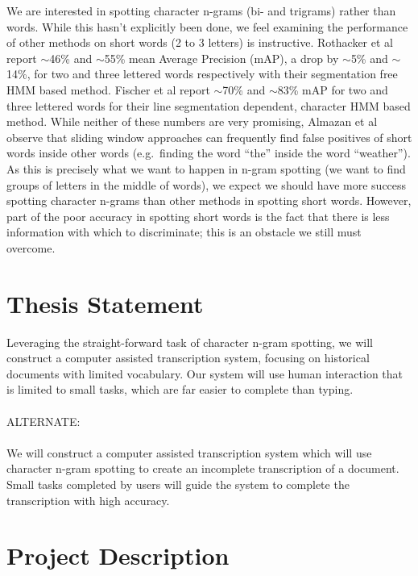 \documentclass[ms]{byuprop}
\begin{document}
We are interested in spotting character n-grams (bi- and trigrams) rather than words. While this hasn't explicitly been done, we feel examining the performance of other methods on short words (2 to 3 letters) is instructive. Rothacker et al\cite{Rothacker2013} report $\sim$46\% and $\sim$55\% mean Average Precision (mAP), a drop by $\sim$5\% and $\sim$14\%, for two and three lettered words respectively with their segmentation free HMM based method. Fischer et al\cite{Fischer2012} report $\sim$70\% and $\sim$83\% mAP for two and three lettered words for their line segmentation dependent, character HMM based method. While neither of these numbers are very promising, Almazan et al\cite{Almazan2012} observe that sliding window approaches can frequently find false positives of short words inside other words (e.g.~finding the word ``the'' inside the word ``weather''). As this is precisely what we want to happen in n-gram spotting (we want to find groups of letters in the middle of words), we expect we should have more success spotting character n-grams than other methods in spotting short words. However, part of the poor accuracy in spotting short words is the fact that there is less information with which to discriminate; this is an obstacle we still must overcome.


\section{Thesis Statement}

Leveraging the straight-forward task of character n-gram spotting, we will construct a computer assisted transcription system, focusing on historical documents with limited vocabulary. Our system will use human interaction that is limited to small tasks, which are far easier to complete than typing.
\\\\
ALTERNATE:
\\\\
We will construct a computer assisted transcription system which will use character n-gram spotting to create an incomplete transcription of a document. Small tasks completed by users will guide the system to complete the transcription with high accuracy.

\section{Project Description}
\end{document}
